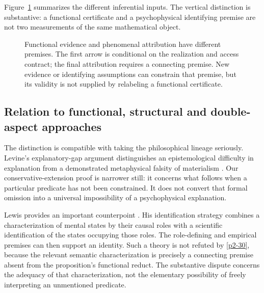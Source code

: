 Figure~\ref{fig:bridge} summarizes the different inferential inputs. The vertical distinction is substantive: a functional certificate and a psychophysical identifying premise are not two measurements of the same mathematical object.
\begin{figure}[tb]
\centering


\caption{Functional evidence and phenomenal attribution have different premises. The first arrow is conditional on the realization and access contract; the final attribution requires a connecting premise. New evidence or identifying assumptions can constrain that premise, but its validity is not supplied by relabeling a functional certificate.}\label{fig:bridge}
\end{figure}

\subsection{Relation to functional, structural and double-aspect approaches}
The distinction is compatible with taking the philosophical lineage seriously. Levine's explanatory-gap argument distinguishes an epistemological difficulty in explanation from a demonstrated metaphysical falsity of materialism \cite{Levine1983}. Our conservative-extension proof is narrower still: it concerns what follows when a particular predicate has not been constrained. It does not convert that formal omission into a universal impossibility of a psychophysical explanation.

Lewis provides an important counterpoint \cite{Lewis1972}. His identification strategy combines a characterization of mental states by their causal roles with a scientific identification of the states occupying those roles. The role-defining and empirical premises can then support an identity. Such a theory is not refuted by \cref{p2-30}, because the relevant semantic characterization is precisely a connecting premise absent from the proposition's functional reduct. The substantive dispute concerns the adequacy of that characterization, not the elementary possibility of freely interpreting an unmentioned predicate.

